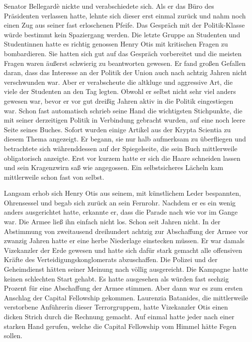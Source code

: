 Senator  Bellegardè nickte und verabschiedete sich. Als er das Büro des Präsidenten verlassen hatte, lehnte sich dieser erst einmal zurück und nahm noch einen Zug aus seiner fast erloschenen Pfeife. Das Gespräch mit der Politik-Klasse würde bestimmt kein Spaziergang werden. Die letzte Gruppe an Studenten und Studentinnen hatte es richtig genossen Henry Otis mit kritischen Fragen zu bombardieren. Sie hatten sich gut auf das Gespräch vorbereitet und die meisten Fragen waren äußerst schwierig zu beantworten gewesen. Er fand großen Gefallen daran, dass das Interesse an der Politik der Union auch nach achtzig Jahren nicht verschwunden war. Aber er verabscheute die altkluge und aggressive Art, die viele der Studenten an den Tag legten. Obwohl er selbst nicht sehr viel anders gewesen war, bevor er vor gut dreißig Jahren aktiv in die Politik eingestiegen war. Schon fast automatisch schrieb seine Hand die wichtigsten Stichpunkte, die mit seiner derzeitigen Politik in Verbindung gebracht wurden, auf eine noch leere Seite seines Buches. Sofort wurden einige Artikel aus der Krypta Scientia zu diesem Thema angezeigt. Er begann, sie nur halb aufmerksam zu überfliegen und betrachtete sich währenddessen auf der Spiegelseite, die sein Buch mittlerweile obligatorisch anzeigte. Erst vor kurzem hatte er sich die Haare schneiden lassen und sein Kragenzwirn saß wie angegossen. Ein selbstsicheres Lächeln kam mittlerweile schon fast von selbst.

\par

Langsam erhob sich Henry Otis aus seinem, mit künstlichem Leder bespannten, Ohrensessel und begab sich zurück an sein Fernrohr. Nachdem er es ein wenig anders ausgerichtet hatte, erkannte er, dass die Parade nach wie vor im Gange war. Die Armee ließ ihn einfach nicht los. Schon seit Jahren nicht. In der Abstimmung von zweitausend dreihundert achtzig zur Abschaffung der Armee vor zwanzig Jahren hatte er eine herbe Niederlage einstecken müssen. Er war damals Vizekanzler der Erde gewesen und hatte sich dafür stark gemacht alle offensiven Kräfte des Verteidigungskonglomerats abzuschaffen. Die Polizei und der Geheimdienst hätten seiner Meinung nach völlig ausgereicht. Die Kampagne hatte keinen schlechten Start gehabt. Es hatte ausgesehen als würden fast sechzig Prozent für eine Abschaffung der Armee stimmen. Aber dann war es zum ersten Anschlag der Capital Fellowship gekommen. Laurenzia Batanides, die mittlerweile verstorbene Anführerin dieser Terrorgruppem, hatte Vizekanzler Otis einen dicken Strich durch die Rechnung gemacht. Auf einmal hatte jeder nach einer starken Hand gerufen, welche die Capital Fellowship vom Himmel hätte Fegen sollen.


